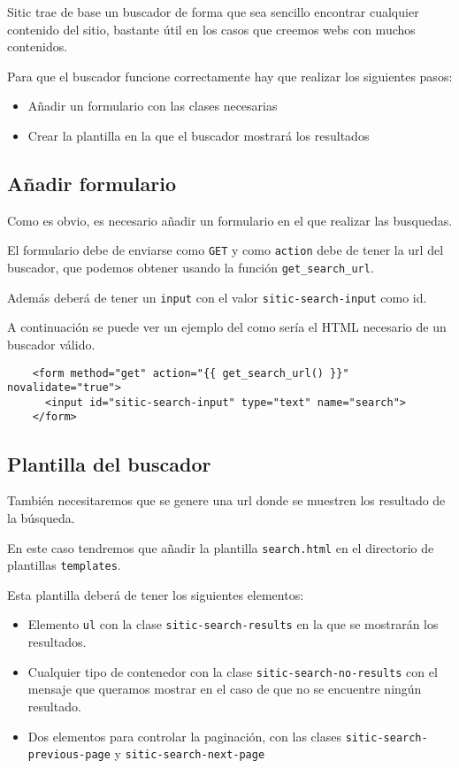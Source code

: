 Sitic trae de base un buscador de forma que sea sencillo encontrar cualquier contenido del sitio,
bastante útil en los casos que creemos webs con muchos contenidos.

Para que el buscador funcione correctamente hay que realizar los siguientes pasos:

\begin{itemize}
    \item Añadir un formulario con las clases necesarias
    \item Crear la plantilla en la que el buscador mostrará los resultados
\end{itemize}

\subsection{Añadir formulario}

Como es obvio, es necesario añadir un formulario en el que realizar las busquedas.

El formulario debe de enviarse como \texttt{GET} y como \texttt{action} debe de tener la url del buscador,
que podemos obtener usando la función \texttt{get\_search\_url}.

Además deberá de tener un \texttt{input} con el valor \texttt{sitic-search-input} como id.

A continuación se puede ver un ejemplo del como sería el HTML necesario de un buscador válido.

\begin{verbatim}
    <form method="get" action="{{ get_search_url() }}" novalidate="true">
      <input id="sitic-search-input" type="text" name="search">
    </form>
\end{verbatim}

\subsection{Plantilla del buscador}

También necesitaremos que se genere una url donde se muestren los resultado de la búsqueda.

En este caso tendremos que añadir la plantilla \texttt{search.html} en el directorio de
plantillas \texttt{templates}.

Esta plantilla deberá de tener los siguientes elementos:

\begin{itemize}
    \item Elemento \texttt{ul} con la clase \texttt{sitic-search-results} en la que se mostrarán
        los resultados.
    \item Cualquier tipo de contenedor con la clase \texttt{sitic-search-no-results} con el mensaje
        que queramos mostrar en el caso de que no se encuentre ningún resultado.
    \item Dos elementos para controlar la paginación, con las clases \texttt{sitic-search-previous-page}
        y \texttt{sitic-search-next-page}
\end{itemize}

